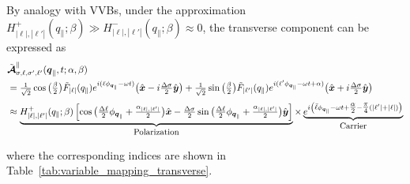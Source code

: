 \noindent
By analogy with VVBs, under the approximation $H_{|\ell|,|\ell'|}^+(q_\parallel; \beta) \gg H_{|\ell|,|\ell'|}^-(q_\parallel; \beta) \approx 0$, the transverse component can be expressed as
\begin{equation}
\label{transverse}
\begin{aligned}
&\tilde{\boldsymbol{\mathcal{A}}}_{\sigma,\ell,\sigma',\ell'}^{\parallel}(\boldsymbol{q}_{\|}, t; \alpha, \beta) \\
&= \tfrac{1}{\sqrt{2}} \cos \big( \tfrac{\beta}{2} \big) \tilde{F}_{|\ell|}(q_{\|}) e^{i(\ell\phi_{\boldsymbol{q}_{\|}} - \omega t)} \big( \hat{\boldsymbol{x}} - i \tfrac{\Delta\sigma}{2} \hat{\boldsymbol{y}} \big) + \tfrac{1}{\sqrt{2}} \sin \big( \tfrac{\beta}{2} \big) \tilde{F}_{|\ell'|}(q_{\|}) e^{i(\ell'\phi_{\boldsymbol{q}_{\|}} - \omega t + \alpha)}  \big( \hat{\boldsymbol{x}} + i \tfrac{\Delta\sigma}{2} \hat{\boldsymbol{y}} \big) \\[0.3em]
&\approx \underbrace{H_{|\ell|,|\ell'|}^{+}(q_{\|}; \beta) \left[ \cos \big( \tfrac{\Delta\ell}{2}\phi_{\boldsymbol{q}_{\|}} + \tfrac{\alpha_{|\ell|,|\ell'|}}{2} \big) \hat{\boldsymbol{x}} - \tfrac{\Delta\sigma}{2} \sin \big( \tfrac{\Delta\ell}{2}\phi_{\boldsymbol{q}_{\|}} + \tfrac{\alpha_{|\ell|,|\ell'|}}{2} \big) \hat{\boldsymbol{y}} \right]}_{\text{\small Polarization}} \times \underbrace{e^{i \left( \bar{\ell}\phi_{\boldsymbol{q}_{\|}}-\omega t + \tfrac{\alpha}{2} - \tfrac{\pi}{4}(|\ell'| + |\ell|) \right)}}_{\text{\small Carrier}}
\end{aligned}
\end{equation}

\noindent
where the corresponding indices are shown in Table~\ref{tab:variable_mapping_transverse}.

